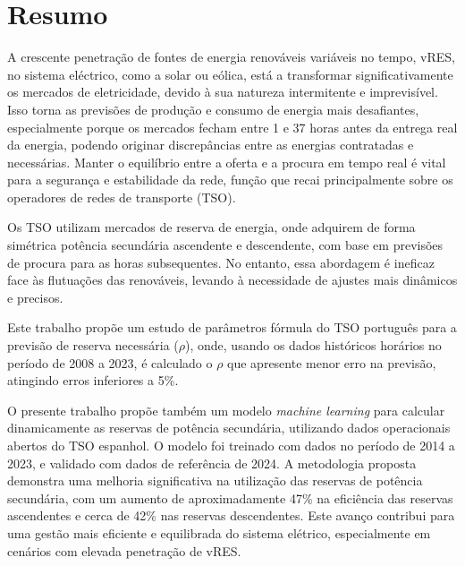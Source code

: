 \chapter{Resumo}
\justifying

A crescente penetração de fontes de energia renováveis variáveis no tempo, vRES, no sistema eléctrico, como a solar ou eólica, está a transformar significativamente os mercados de eletricidade, devido à sua natureza intermitente e imprevisível. Isso torna as previsões de produção e consumo de energia mais desafiantes, especialmente porque os mercados fecham entre 1 e 37 horas antes da entrega real da energia, podendo originar discrepâncias entre as energias contratadas e necessárias. Manter o equilíbrio entre a oferta e a procura em tempo real é vital para a segurança e estabilidade da rede, função que recai principalmente sobre os operadores de redes de transporte (TSO).\par
Os TSO utilizam mercados de reserva de energia, onde adquirem de forma simétrica potência secundária ascendente e descendente, com base em previsões de procura para as horas subsequentes. No entanto, essa abordagem é ineficaz face às flutuações das renováveis, levando à necessidade de ajustes mais dinâmicos e precisos.\par
Este trabalho propõe um estudo de parâmetros fórmula do TSO português para a previsão de reserva necessária ($\rho$), onde, usando os dados históricos horários no período de 2008 a 2023, é calculado o $\rho$ que apresente menor erro na previsão, atingindo erros inferiores a 5\%.\par
O presente trabalho propõe também um modelo \textit{machine learning} para calcular dinamicamente as reservas de potência secundária, utilizando dados operacionais abertos do TSO espanhol. O modelo foi treinado com dados no período de 2014 a 2023, e validado com dados de referência de 2024. A metodologia proposta demonstra uma melhoria significativa na utilização das reservas de potência secundária, com um aumento de aproximadamente 47\% na eficiência das reservas ascendentes e cerca de 42\% nas reservas descendentes. Este avanço contribui para uma gestão mais eficiente e equilibrada do sistema elétrico, especialmente em cenários com elevada penetração de vRES.\par




\vspace{0.5cm} %

